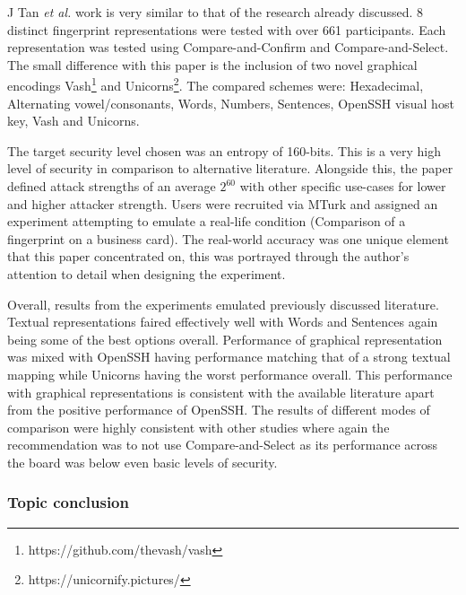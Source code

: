 J Tan \textit{et al.}\cite{tan2017can} work is very similar to that of the research already discussed. 8 distinct fingerprint representations were tested with over 661 participants. Each representation was tested using Compare-and-Confirm and Compare-and-Select. The small difference with this paper is the inclusion of two novel graphical encodings Vash\footnote{https://github.com/thevash/vash} and Unicorns\footnote{https://unicornify.pictures/}. The compared schemes were: Hexadecimal, Alternating vowel/consonants, Words, Numbers, Sentences, OpenSSH visual host key, Vash and Unicorns.

The target security level chosen was an entropy of 160-bits. This is a very high level of security in comparison to alternative literature. Alongside this, the paper defined attack strengths of an average $2^{60}$ with other specific use-cases for lower and higher attacker strength. Users were recruited via MTurk and assigned an experiment attempting to emulate a real-life condition (Comparison of a fingerprint on a business card). The real-world accuracy was one unique element that this paper concentrated on, this was portrayed through the author's attention to detail when designing the experiment.

Overall, results from the experiments emulated previously discussed literature. Textual representations faired effectively well with Words and Sentences again being some of the best options overall. Performance of graphical representation was mixed with OpenSSH having performance matching that of a strong textual mapping while Unicorns having the worst performance overall. This performance with graphical representations is consistent with the available literature apart from the positive performance of OpenSSH. The results of different modes of comparison were highly consistent with other studies where again the recommendation was to not use Compare-and-Select as its performance across the board was below even basic levels of security.

\subsubsection{Topic conclusion}

